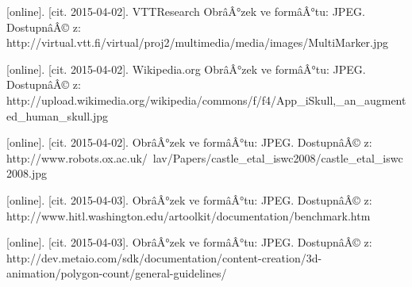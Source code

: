\documentclass[twoside,12pt]{article}
\begin{document}
\begin{literatura}
{
	[online]. [cit. 2015-04-02]. VTTResearch
	ObrâÂ°zek ve formâÂ°tu: JPEG. DostupnâÂ© z: http://virtual.vtt.fi/virtual/proj2/multimedia/media/images/MultiMarker.jpg
}

{
	[online]. [cit. 2015-04-02]. Wikipedia.org
	ObrâÂ°zek ve formâÂ°tu: JPEG. DostupnâÂ© z: http://upload.wikimedia.org/wikipedia/commons/f/f4/App\_iSkull,\_an\_augmented\_human\_skull.jpg
}

{
	[online]. [cit. 2015-04-02]. 
	ObrâÂ°zek ve formâÂ°tu: JPEG. DostupnâÂ© z: http://www.robots.ox.ac.uk/~lav/Papers/castle\_etal\_iswc2008/castle\_etal\_iswc2008.jpg
}

{
	[online]. [cit. 2015-04-03]. 
	ObrâÂ°zek ve formâÂ°tu: JPEG. DostupnâÂ© z: http://www.hitl.washington.edu/artoolkit/documentation/benchmark.htm
}

{
	[online]. [cit. 2015-04-03]. 
	ObrâÂ°zek ve formâÂ°tu: JPEG. DostupnâÂ© z: http://dev.metaio.com/sdk/documentation/content-creation/3d-animation/polygon-count/general-guidelines/
}





%




\end{literatura}
\end{document}
